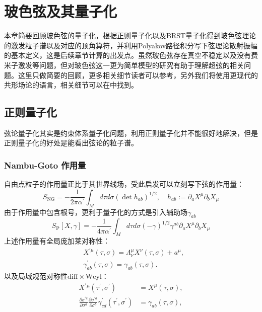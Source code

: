 \chapter{玻色弦及其量子化}
\label{chap:2}
本章简要回顾玻色弦的量子化，根据正则量子化以及BRST量子化得到玻色弦理论的激发粒子谱以及对应的顶角算符，并利用Polyakov路径积分写下弦理论散射振幅的基本定义，这是后续章节计算的出发点。虽然玻色弦存在真空不稳定以及没有费米子激发等问题，但对玻色弦这一更为简单模型的研究有助于理解超弦的相关问题。这里只做简要的回顾，更多相关细节读者可以参考\cite{Polchinski:1998rq,Blumenhagen:2013fgp,Becker:2006dvp}，另外我们将使用更现代的共形场论的语言，相关细节可以在\cite{DiFrancesco:1997nk,Blumenhagen:2009zz}中找到。

\section{正则量子化}
弦论量子化其实是约束体系量子化问题，利用正则量子化并不能很好地解决，但是正则量子化的好处是能看出弦论的粒子谱。
\subsection{Nambu-Goto 作用量}
自由点粒子的作用量正比于其世界线场，受此启发可以立刻写下弦的作用量：
\begin{equation}
	S_{\text{NG}}=-\frac{1}{2\pi\alpha^\prime}\int_M d\tau d\sigma \left(\det h_{ab}\right)^{1/2},\quad h_{ab}:=\partial_a X^\mu \partial_b X_\mu
\end{equation}
由于作用量中包含根号，更利于量子化的方式是引入辅助场$\gamma_{ab}$
\begin{equation}
	\label{eq:2.2}
	S_\mathrm{P}[X,\gamma]=-\frac{1}{4\pi\alpha^{\prime}}\int_Md\tau d\sigma\left(-\gamma\right)^{1/2}\gamma^{ab}\partial_aX^\mu\partial_bX_\mu
\end{equation}
上述作用量有全局庞加莱对称性：
\begin{equation}
	\begin{aligned}&X^{\prime\mu}(\tau,\sigma)=\Lambda_{\nu}^{\mu}X^{\nu}(\tau,\sigma)+a^{\mu},\\&\gamma_{ab}^{\prime}(\tau,\sigma)=\gamma_{ab}(\tau,\sigma).\end{aligned}
\end{equation}
以及局域规范对称性$\mathrm{diff}\times\mathrm{Weyl}$：
\begin{equation}
	\begin{aligned}
		X^{\prime}{}^{\mu}(\tau^{\prime},\sigma^{\prime})&=X^{\mu}(\tau,\sigma),\\ \frac{\partial\sigma^{\prime c}}{\partial\sigma^a}\frac{\partial\sigma^{\prime a}}{\partial\sigma^b}\gamma_{cd}^{\prime}(\tau^{\prime},\sigma^{\prime})&=\gamma_{ab}(\tau,\sigma),
	\end{aligned}
\end{equation}
	
